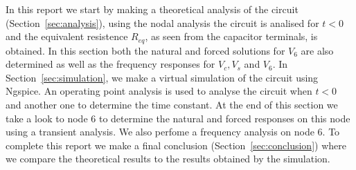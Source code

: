 In this report we start by making a theoretical analysis of the circuit (Section~\ref{sec:analysis}), using the nodal analysis the circuit is analised for $t<0$ and the equivalent resistence $R_{eq}$, as seen from the capacitor terminals, is obtained. In this section both the natural and forced solutions for $V_6$ are also determined as well as the frequency responses for $V_c, V_s$ and $V_6 $. In Section~\ref{sec:simulation}, we make a virtual simulation of the circuit using Ngspice. An operating point analysis is used to analyse the circuit when $t<0$ and another one to determine the time constant. At the end of this section we take a look to node 6 to determine the natural and forced responses on this node using a transient analysis. We also perfome a frequency analysis on node 6. To complete this report we make a final conclusion (Section~\ref{sec:conclusion}) where we compare the theoretical results to the results obtained by the simulation.


\pagebreak

